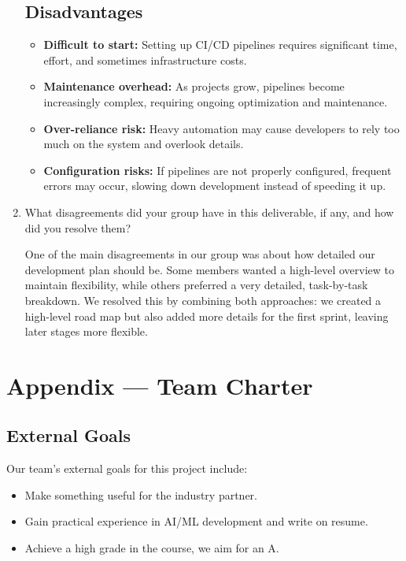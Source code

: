 \documentclass{article}
\begin{document}
\begin{enumerate}
\subsection*{Disadvantages}
\begin{itemize}
    \item \textbf{Difficult to start:} Setting up CI/CD pipelines requires significant time, effort, and sometimes infrastructure costs.
    \item \textbf{Maintenance overhead:} As projects grow, pipelines become increasingly complex, requiring ongoing optimization and maintenance.
    \item \textbf{Over-reliance risk:} Heavy automation may cause developers to rely too much on the system and overlook details.
    \item \textbf{Configuration risks:} If pipelines are not properly configured, frequent errors may occur, slowing down development instead of speeding it up.
\end{itemize}
    \item What disagreements did your group have in this deliverable, if any,
    and how did you resolve them?

    One of the main disagreements in our group was about how detailed our development plan should be. Some members wanted a high-level overview to maintain flexibility, while others preferred a very detailed, task-by-task breakdown. We resolved this by combining both approaches: we created a high-level road map but also added more details for the first sprint, leaving later stages more flexible.

\end{enumerate}


\section*{Appendix --- Team Charter}


\subsection*{External Goals}

Our team's external goals for this project include:
\begin{itemize}
  \item Make something useful for the industry partner.
  \item Gain practical experience in AI/ML development and write on resume.
  \item Achieve a high grade in the course, we aim for an A.
\end{itemize}
\end{document}
